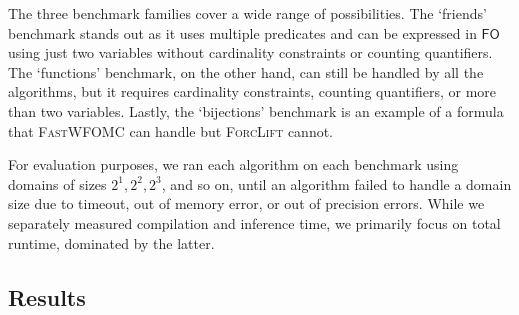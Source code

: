 \documentclass[a4paper,UKenglish,cleveref, autoref, thm-restate]{lipics-v2021}
\newcommand{\FO}{$\mathsf{FO}$}
\begin{document}
The three benchmark families cover a wide range of possibilities. The
`friends' benchmark stands out as it uses multiple predicates and can be
expressed in \FO{} using just two variables without cardinality constraints or
counting quantifiers. The `functions' benchmark, on the other hand, can still be
handled by all the algorithms, but it requires cardinality constraints, counting
quantifiers, or more than two variables. Lastly, the `bijections' benchmark is
an example of a formula that \textsc{FastWFOMC} can handle but \textsc{ForcLift}
cannot.



For evaluation purposes, we ran each algorithm on each benchmark using domains
of sizes $2^{1}, 2^{2}, 2^{3}$, and so on, until an algorithm failed to handle a
domain size due to timeout, out of memory error, or out of precision errors.
While we separately measured compilation and inference time, we primarily focus
on total runtime, dominated by the latter.





\subsection{Results}

\end{document}

